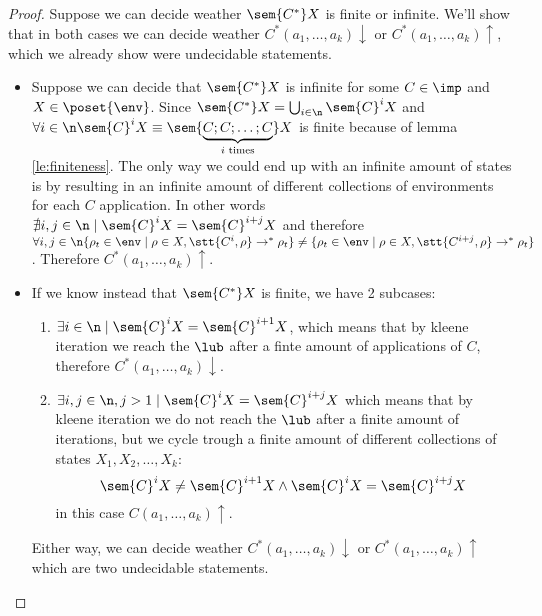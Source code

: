 \begin{proof}
  Suppose we can decide weather \(\sem{C^*}X\) is finite or
  infinite. We'll show that in both cases we can decide weather
  \(C^*(a_1, \dots, a_k)\downarrow\) or \(C^*(a_1, \dots,
  a_k)\uparrow\), which we already show were undecidable statements.
  \begin{itemize}
  \item Suppose we can decide that \(\sem{C^*}X\) is infinite for some
    \(C\in\imp\) and \(X\in\poset{\env}\). Since \(\sem{C^*}X =
    \bigcup_{i\in\n}\sem{C}^i X\) and \(\forall i \in \n \sem{C}^i X
    \equiv \sem{\underbrace{C;C;\dots;C}_{i\text{ times}}}X\) is
    finite because of lemma \ref{le:finiteness}. The only way we could
    end up with an infinite amount of states is by resulting in an
    infinite amount of different collections of environments for each
    \(C\) application. In other words \(\nexists i,j \in \n \mid
    \sem{C}^i X = \sem{C}^{i+j}X\) and therefore \(\forall i,j\in\n
    \{\rho_t \in \env \mid \rho \in X , \stt{C^i, \rho} \to^* \rho_t\}
    \neq \{\rho_t \in \env \mid \rho \in X , \stt{C^{i+j}, \rho} \to^*
    \rho_t\}\). Therefore \(C^*(a_1, \dots, a_k)\uparrow\).
  \item If we know instead that \(\sem{C^*}X\) is finite, we have 2
    subcases:
    \begin{enumerate}
    \item \(\exists i \in\n \mid \sem{C}^iX = \sem{C}^{i+1}X\), which
      means that by kleene iteration we reach the \(\lub\) after a
      finte amount of applications of \(C\), therefore \(C^*(a_1,
      \dots, a_k)\downarrow\).
    \item \(\exists i,j \in \n, j > 1 \mid \sem{C}^iX = \sem{C}^{i +
      j}X\) which means that by kleene iteration we do not reach the
      \(\lub\) after a finite amount of iterations, but we cycle
      trough a finite amount of different collections of states \(X_1,
      X_2, \dots, X_k\): \[\sem{C}^iX \neq \sem{C}^{i+1}X \wedge
      \sem{C}^iX = \sem{C}^{i+j}X\] in this case \(C(a_1, \dots,
      a_k)\uparrow\).
    \end{enumerate}

    Either way, we can decide weather \(C^*(a_1, \dots, a_k)
    \downarrow\) or \(C^*(a_1, \dots, a_k) \uparrow\) which are two
    undecidable statements.
  \end{itemize}
\end{proof}
